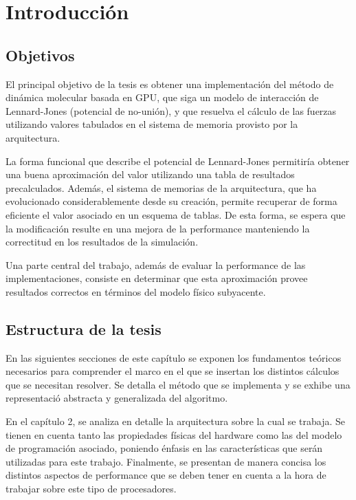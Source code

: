 \chapter{Introducción}
\section{Objetivos}



El principal objetivo de la tesis es obtener una implementación del método de dinámica molecular basada en GPU, que siga un modelo de interacción de Lennard-Jones (potencial de no-unión), 
y que resuelva el cálculo de las fuerzas utilizando valores tabulados en el sistema de memoria provisto por la arquitectura. 

La forma funcional que describe el potencial de Lennard-Jones permitiría obtener una buena aproximación del valor utilizando una tabla de resultados precalculados. 
Además, el sistema de memorias de la arquitectura, que ha evolucionado considerablemente desde su creación, permite recuperar de forma eficiente el valor asociado en un esquema de tablas. 
De esta forma, se espera que la modificación resulte en una mejora de la performance manteniendo la correctitud en los resultados de la simulación. 

Una parte central del trabajo, además de evaluar la performance de las implementaciones, consiste en determinar que esta aproximación provee resultados correctos en términos del modelo físico subyacente.

\section{Estructura de la tesis}

En las siguientes secciones de este capítulo se exponen los fundamentos teóricos necesarios para comprender el marco en el que se insertan los distintos cálculos que se necesitan resolver. 
Se detalla el método que se implementa y se exhibe una representaci\'o abstracta y generalizada del algoritmo.

En el capítulo 2, se analiza en detalle la arquitectura sobre la cual se trabaja. Se tienen en cuenta tanto las propiedades físicas del hardware como las del modelo de programación asociado,
poniendo \'enfasis en las caracter\'isticas que ser\'an utilizadas para este trabajo.
Finalmente, se presentan de manera concisa los distintos aspectos de performance que se deben tener en cuenta a la hora de trabajar sobre este tipo de procesadores.

